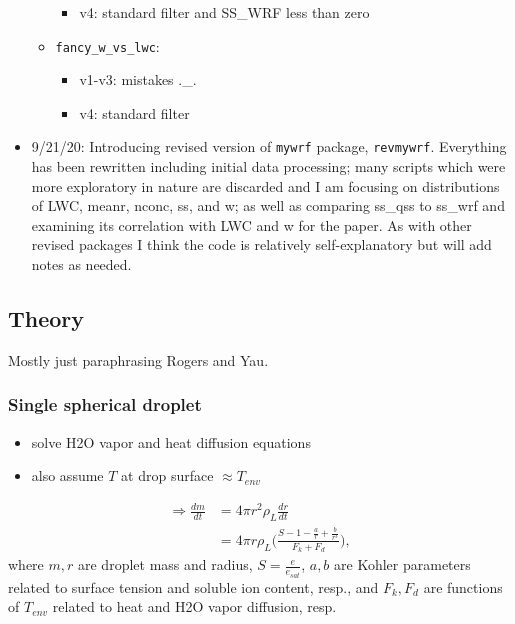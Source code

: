 \documentclass{article}
\begin{document}
\begin{itemize}
\begin{itemize}
\begin{itemize}
			\item v4: standard filter and SS\_WRF less than zero
		\end{itemize}
		\item \texttt{fancy\_w\_vs\_lwc}:
		\begin{itemize}
			\item v1-v3: mistakes .\_.
			\item v4: standard filter
		\end{itemize}
	\end{itemize}
	\item 9/21/20: Introducing revised version of \texttt{mywrf} package, \texttt{revmywrf}. Everything has been rewritten including initial data processing; many scripts which were more exploratory in nature are discarded and I am focusing on distributions of LWC, meanr, nconc, ss, and w; as well as comparing ss\_qss to ss\_wrf and examining its correlation with LWC and w for the paper. As with other revised packages I think the code is relatively self-explanatory but will add notes as needed. 
\end{itemize}
\subsection{Theory}

\noindent Mostly just paraphrasing Rogers and Yau.

\subsubsection{Single spherical droplet}
\begin{itemize}
	\item solve H2O vapor and heat diffusion equations
	\item also assume $T$ at drop surface $\approx T_{env}$
\end{itemize}
\begin{align}
\Rightarrow \frac{dm}{dt} &= 4\pi r^2 \rho_L \frac{dr}{dt} \nonumber\\
&= 4\pi r \rho_L \Bigg(\frac{S - 1 - \frac{a}{r} + \frac{b}{r^3}}{F_k + F_d}\Bigg),
\end{align}
where $m,r$ are droplet mass and radius, $S=\frac{e}{e_{sat}}$, $a,b$ are Kohler parameters related to surface tension and soluble ion content, resp., and $F_k, F_d$ are functions of $T_{env}$ related to heat and H2O vapor diffusion, resp.
\end{document}
